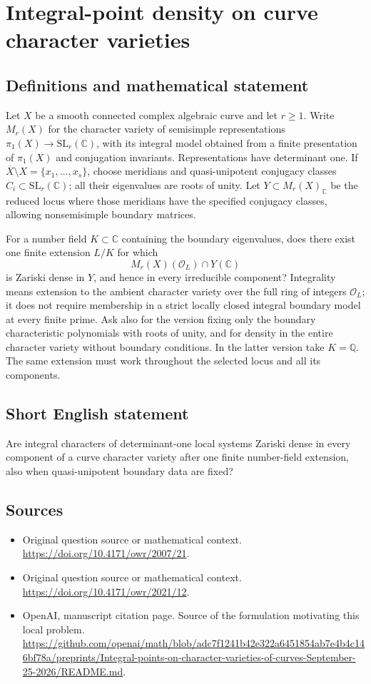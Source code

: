 \documentclass[11pt]{article}
\begin{document}
\section*{Integral-point density on curve character varieties}\label{statement}
\subsection{Definitions and mathematical statement}
Let $X$ be a smooth connected complex algebraic curve and let $r\ge1$. Write $M_r(X)$ for the character variety of semisimple representations $\pi_1(X)\to\mathrm{SL}_r(\mathbb C)$, with its integral model obtained from a finite presentation of $\pi_1(X)$ and conjugation invariants. Representations have determinant one. If $\overline X\setminus X=\{x_1,\ldots,x_s\}$, choose meridians and quasi-unipotent conjugacy classes $C_i\subset\mathrm{SL}_r(\mathbb C)$; all their eigenvalues are roots of unity. Let $Y\subset M_r(X)_{\mathbb C}$ be the reduced locus where those meridians have the specified conjugacy classes, allowing nonsemisimple boundary matrices.

For a number field $K\subset\mathbb C$ containing the boundary eigenvalues, does there exist one finite extension $L/K$ for which
\[
 M_r(X)(\mathcal O_L)\cap Y(\mathbb C)
\]
is Zariski dense in $Y$, and hence in every irreducible component? Integrality means extension to the ambient character variety over the full ring of integers $\mathcal O_L$; it does not require membership in a strict locally closed integral boundary model at every finite prime. Ask also for the version fixing only the boundary characteristic polynomials with roots of unity, and for density in the entire character variety without boundary conditions. In the latter version take $K=\mathbb Q$. The same extension must work throughout the selected locus and all its components.

\subsection{Short English statement}
Are integral characters of determinant-one local systems Zariski dense in every component of a curve character variety after one finite number-field extension, also when quasi-unipotent boundary data are fixed?

\subsection{Sources}
\begin{itemize}
\item[S1] Original question source or mathematical context.
\url{https://doi.org/10.4171/owr/2007/21}.
\item[S2] Original question source or mathematical context.
\url{https://doi.org/10.4171/owr/2021/12}.
\item[S3] OpenAI, manuscript citation page. Source of the formulation motivating this local problem.
\url{https://github.com/openai/math/blob/adc7f1241b42e322a6451854ab7e4b4c146bf78a/preprints/Integral-points-on-character-varieties-of-curves-September-25-2026/README.md}.
\end{itemize}
\end{document}
